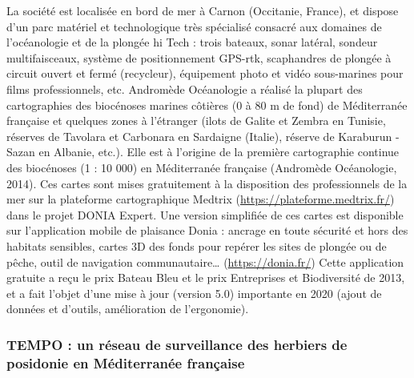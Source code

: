 La société est localisée en bord de mer à Carnon (Occitanie, France), et dispose d’un parc matériel et technologique très spécialisé consacré aux domaines de l'océanologie et de la plongée hi Tech : trois bateaux, sonar latéral, sondeur multifaisceaux, système de positionnement GPS-rtk, scaphandres de plongée à circuit ouvert et fermé (recycleur), équipement photo et vidéo sous-marines pour films professionnels, etc. Andromède Océanologie a réalisé la plupart des cartographies des biocénoses marines côtières (0 à 80 m de fond) de Méditerranée française et quelques zones à l’étranger (ilots de Galite et Zembra en Tunisie, réserves de Tavolara et Carbonara en Sardaigne (Italie), réserve de Karaburun - Sazan en Albanie, etc.). Elle est à l’origine de la première cartographie continue des biocénoses (1 : 10 000) en Méditerranée française (Andromède Océanologie, 2014). Ces cartes sont mises gratuitement à la disposition des professionnels de la mer sur la plateforme cartographique Medtrix (\href{https://plateforme.medtrix.fr/}{https://plateforme.medtrix.fr/}) dans le projet DONIA Expert. Une version simplifiée de ces cartes est disponible sur l’application mobile de plaisance Donia : ancrage en toute sécurité et hors des habitats sensibles, cartes 3D des fonds pour repérer les sites de plongée ou de pêche, outil de navigation communautaire… (\href{https://donia.fr/}{https://donia.fr/}) Cette application gratuite a reçu le prix Bateau Bleu et le prix Entreprises et Biodiversité de 2013, et a fait l’objet d’une mise à jour (version 5.0) importante en 2020 (ajout de données et d’outils, amélioration de l’ergonomie).

\subsubsection{TEMPO : un réseau de surveillance des herbiers de posidonie en Méditerranée française}\label{intro.2.3.2}

